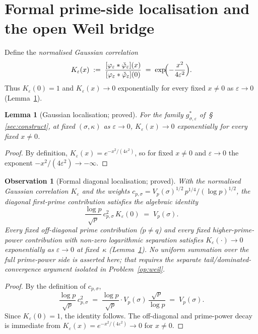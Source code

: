 \documentclass[11pt]{article}
\newtheorem{lemma}[theorem]{Lemma}
\newtheorem{observation}[theorem]{Observation}
\begin{document}
\section{Formal prime-side localisation and the open Weil bridge}
\label{sec:prime-side}

Define the \emph{normalised Gaussian correlation}
\[
K_\varepsilon(x)
\;:=\;
\frac{[\varphi_\varepsilon*\check\varphi_\varepsilon](x)}
     {[\varphi_\varepsilon*\check\varphi_\varepsilon](0)}
\;=\; \exp\!\Bigl(-\frac{x^2}{4\varepsilon^2}\Bigr).
\]
Thus $K_\varepsilon(0)=1$ and $K_\varepsilon(x)\to 0$
exponentially for every fixed $x\ne 0$ as $\varepsilon\to 0$
(Lemma~\ref{lem:gauss}).

\begin{lemma}[Gaussian localisation; proved]\label{lem:gauss}
For the family $g^*_{\sigma,\varepsilon}$
of~\S\,\ref{sec:construct}, at fixed $(\sigma,\kappa)$ as
$\varepsilon\to 0$,
$K_\varepsilon(x)\to 0$ exponentially for every
fixed $x\ne 0$.
\end{lemma}

\begin{proof}
By definition,
$K_\varepsilon(x)=e^{-x^2/(4\varepsilon^2)}$,
so for fixed $x\ne 0$ and $\varepsilon\to 0$ the exponent
$-x^2/(4\varepsilon^2)\to -\infty$.
\end{proof}

\begin{observation}[Formal diagonal localisation; proved]
\label{obs:diagonal}
With the normalised Gaussian correlation $K_\varepsilon$ and the
weights $c_{p,\sigma}=V_p(\sigma)^{1/2}\,p^{1/4}/(\log p)^{1/2}$,
the diagonal first-prime contribution satisfies the algebraic identity
\[
\frac{\log p}{\sqrt{p}}\,c_{p,\sigma}^2\,K_\varepsilon(0)
\;=\; V_p(\sigma).
\]
Every fixed off-diagonal prime contribution
($p\ne q$) and every fixed higher-prime-power
contribution with non-zero logarithmic separation
satisfies $K_\varepsilon(\cdot)\to 0$ exponentially
as $\varepsilon\to 0$ at fixed~$\kappa$
(Lemma~\ref{lem:gauss}).
No uniform summation over the full prime-power side
is asserted here; that requires the separate
tail/dominated-convergence argument isolated in
Problem~\ref{op:weil}.
\end{observation}

\begin{proof}
By the definition of $c_{p,\sigma}$,
\[
\frac{\log p}{\sqrt{p}}\,c_{p,\sigma}^2
\;=\;
\frac{\log p}{\sqrt{p}}\cdot
V_p(\sigma)\,\frac{\sqrt{p}}{\log p}
\;=\; V_p(\sigma).
\]
Since $K_\varepsilon(0)=1$, the identity follows.
The off-diagonal and prime-power decay is immediate from
$K_\varepsilon(x)=e^{-x^2/(4\varepsilon^2)}\to 0$ for $x\ne 0$.
\end{proof}
\end{document}
